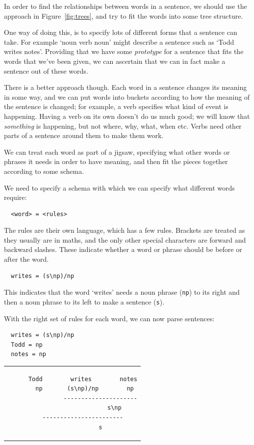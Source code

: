 In order to find the relationships between words in a sentence, we should use
the approach in Figure~\ref{fig:trees}, and try to fit the words into some tree
structure.

One way of doing this, is to specify lots of different forms that a sentence can
take. For example `noun verb noun' might describe a sentence such as `Todd
writes notes'. Providing that we have some \textit{prototype} for a sentence
that fits the words that we've been given, we can ascertain that we can in fact
make a sentence out of these words.

There is a better approach though. Each word in a sentence changes its meaning
in some way, and we can put words into buckets according to how the meaning of
the sentence is changed; for example, a verb specifies what kind of event is
happening. Having a verb on its own doesn't do us much good; we will know that
\textit{something} is happening, but not where, why, what, when etc. Verbs need
other parts of a sentence around them to make them work.

We can treat each word as part of a jigsaw, specifying what other words or
phrases it needs in order to have meaning, and then fit the pieces together
according to some schema.

We need to specify a schema with which we can specify what different words require:

\begin{verbatim}
  <word> = <rules>
\end{verbatim}

The rules are their own language, which has a few rules. Brackets are
treated as they usually are in maths, and the only other special characters are
forward and backward slashes. These indicate whether a word or phrase should be
before or after the word.

\begin{verbatim}
  writes = (s\np)/np
\end{verbatim}

This indicates that the word `writes' needs a noun phrase (\texttt{np}) to its
right and then a noun phrase to its left to make a sentence (\texttt{s}).

With the right set of rules for each word, we can now parse sentences:

\begin{verbatim}
  writes = (s\np)/np
  Todd = np
  notes = np
\end{verbatim}

\begin{center}
  \begin{tabular}{c}
    \begin{lstlisting}
      Todd        writes        notes
       np       (s\np)/np        np
                ---------------------
                        s\np
      -----------------------
                s
    \end{lstlisting}
  \end{tabular}
\end{center}

